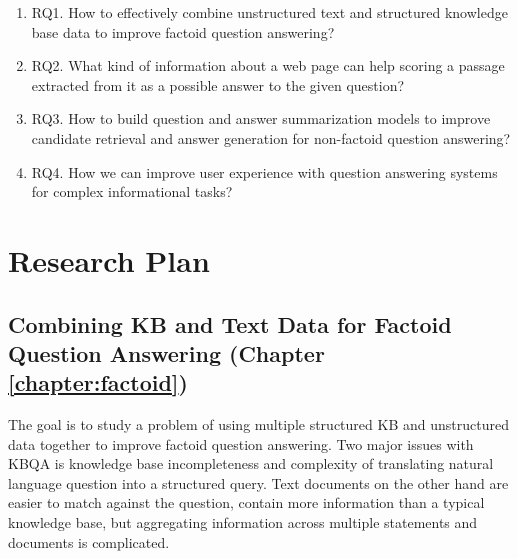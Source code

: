 \begin{enumerate}
\item RQ1. How to effectively combine unstructured text and structured knowledge base data to improve factoid question answering?
\item RQ2. What kind of information about a web page can help scoring a passage extracted from it as a possible answer to the given question?
\item RQ3. How to build question and answer summarization models to improve candidate retrieval and answer generation for non-factoid question answering?
\item RQ4. How we can improve user experience with question answering systems for complex informational tasks?
\end{enumerate}


\section{Research Plan}

\subsection{Combining KB and Text Data for Factoid Question Answering (Chapter \ref{chapter:factoid})}
\label{sec:plan1}

The goal is to study a problem of using multiple structured KB and unstructured data together to improve factoid question answering.
Two major issues with KBQA is knowledge base incompleteness and complexity of translating natural language question into a structured query.
Text documents on the other hand are easier to match against the question, contain more information than a typical knowledge base, but aggregating information across multiple statements and documents is complicated.

